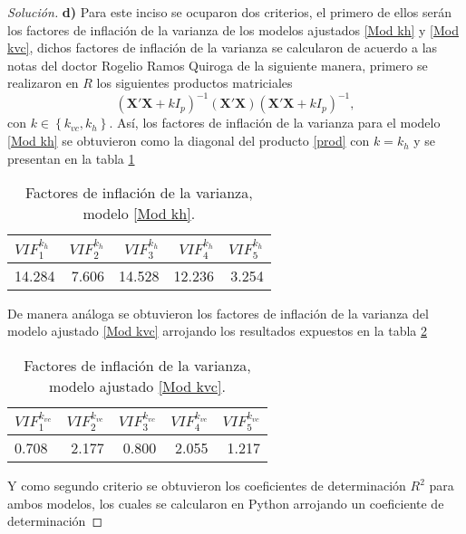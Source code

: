 \documentclass[10.5pt,notitlepage]{article}
\newenvironment{solucion}
  {\begin{proof}[Solución]}
  {\end{proof}}
\newcommand{\kis}[1]{\left\{ #1 \right\}}
\theoremstyle{plain}
\begin{document}
\begin{solucion}
\noindent \textbf{d)} Para este inciso se ocuparon dos criterios, el primero de ellos serán los factores de inflación de la varianza de los modelos ajustados \eqref{Mod kh} y \eqref{Mod kvc}, dichos factores de inflación de la varianza se calcularon de acuerdo a las notas del doctor Rogelio Ramos Quiroga de la siguiente manera, primero se realizaron en \(R\) los siguientes productos matriciales 
\begin{equation}\label{prod}
     (\mathbf{X}'\mathbf{X} + k I_{p})^{-1}(\mathbf{X}'\mathbf{X})(\mathbf{X}'\mathbf{X} + k I_{p})^{-1},
\end{equation}
con \(k \in \kis{k_{vc},k_{h}}\). Así, los factores de inflación de la varianza para el modelo \eqref{Mod kh} se obtuvieron como la diagonal del producto \eqref{prod} con \(k = k_{h}\) y se presentan en la tabla \ref{tab:ref20}
\begin{table}[H]
        \centering
        \begin{tabular}{@{}l@{\hskip 0.3in}r@{\hskip 0.3in}r@{\hskip 0.3in}r@{\hskip 0.3in}r@{}}
            \toprule
            \(VIF_{1}^{k_h}\)& \(VIF_{2}^{k_h}\) & \(VIF_{3}^{k_h}\)& \(VIF_{4}^{k_h}\)& \(VIF_{5}^{k_h}\) \\
            \midrule
             14.284& 7.606 &14.528 &12.236 & 3.254\\  
            \bottomrule
        \end{tabular}
        \caption{Factores de inflación de la varianza, modelo \eqref{Mod kh}.}
        \label{tab:ref20}
\end{table}
De manera análoga se obtuvieron los factores de inflación de la varianza del modelo ajustado \eqref{Mod kvc} arrojando los resultados expuestos en la tabla \ref{tab:ref21}
\begin{table}[H]
        \centering
        \begin{tabular}{@{}l@{\hskip 0.3in}r@{\hskip 0.3in}r@{\hskip 0.3in}r@{\hskip 0.3in}r@{}}
            \toprule
            \(VIF_{1}^{k_{vc}}\)& \(VIF_{2}^{k_{vc}}\) & \(VIF_{3}^{k_{vc}}\)& \(VIF_{4}^{k_{vc}}\)& \(VIF_{5}^{k_{vc}}\) \\
            \midrule
             0.708 &2.177 &0.800& 2.055& 1.217 \\  
            \bottomrule
        \end{tabular}
        \caption{Factores de inflación de la varianza, modelo ajustado \eqref{Mod kvc}.}
        \label{tab:ref21}
\end{table}
Y como segundo criterio se obtuvieron los coeficientes de determinación \(R^2\) para ambos modelos, los cuales se calcularon en Python arrojando un coeficiente de determinación 

\end{solucion}
\end{document}
